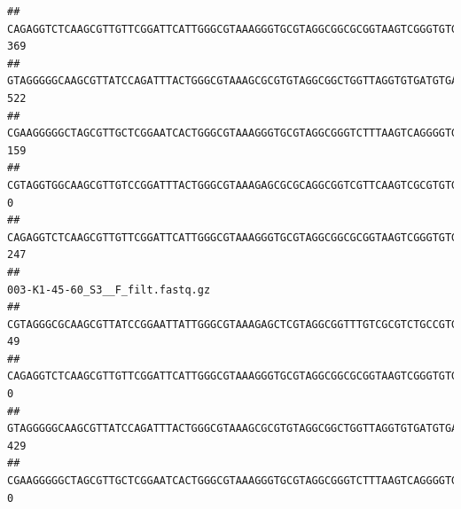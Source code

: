 \documentclass[]{article}
\begin{document}
\begin{verbatim}
## CAGAGGTCTCAAGCGTTGTTCGGATTCATTGGGCGTAAAGGGTGCGTAGGCGGCGCGGTAAGTCGGGTGTGAAATCTCGGAGCTTAACTCCGAAACTGCATTCGATACTGCCGTGCTTGAGGACTGGAGAGGAGACTGGAATTTACGGTGTAGCGGTGAAATGCGTAGATATCGTAAGGAAGACCAGTGGCGAAGGCGGGTCTCTGGACAGTTCCTGACGCTGAGGCACGAAGGCCAGGGGAGCAAACG                              369
## GTAGGGGGCAAGCGTTATCCAGATTTACTGGGCGTAAAGCGCGTGTAGGCGGCTGGTTAGGTGTGATGTGAAATCTTCCGGCTCAACCGGAAAACTGCATTGCAAACCGGCCTGGCTAGAGTGCAGGAGAGGGAAGCGGAATTCCAGGTGTAGCGGTGAAATGCGTAGATATCTGGAGGAACACCAGTGGCGAAGGCGGCTTCCTGGCCTGCAACTGACGCTGAGACGCGAAAGCGTGGGGAGCGAAC                               522
## CGAAGGGGGCTAGCGTTGCTCGGAATCACTGGGCGTAAAGGGTGCGTAGGCGGGTCTTTAAGTCAGGGGTGAAATCCTGGAGCTCAACTCCAGAACTGCCTTTGATACTGAAGATCTTGAGTTCGGGAGAGGTGAGTGGAACTGCGAGTGTAGAGGTGAAATTCGTAGATATTCGCAAGAACACCAGTGGCGAAGGCGGCTCACTGGCCCGATACTGACGCTGAGGCACGAAAGCGTGGGGAGCAAACA                              159
## CGTAGGTGGCAAGCGTTGTCCGGATTTACTGGGCGTAAAGAGCGCGCAGGCGGTCGTTCAAGTCGCGTGTGAAAGCCCCCGGCTCAACTGGGGAGGGTCACGCGATACTGATCGACTCGAAGGCAGGAGAGGGTAGTGGAATTCCCGGTGTAGTGGTGAAATGCGTAGATATCGGGAGGAACACCAGTGGCGAAGGCGACTACCTGGCCTGTTCTTGACGCTGAGGCGCGAAAGCTAGGGGAGCAAACG                                0
## CAGAGGTCTCAAGCGTTGTTCGGATTCATTGGGCGTAAAGGGTGCGTAGGCGGCGCGGTAAGTCGGGTGTGAAATCTCGGGGCTTAACTCCGAAACTGCATTCGATACTGCCGTGCTTGAGGACTGGAGAGGAGACTGGAATTTACGGTGTAGCGGTGAAATGCGTAGATATCGTAAGGAAGACCAGTGGCGAAGGCGGGTCTCTGGACAGTTCCTGACGCTGAGGCACGAAGGCCAGGGGAGCAAACG                              247
##                                                                                                                                                                                                                                                           003-K1-45-60_S3__F_filt.fastq.gz
## CGTAGGGCGCAAGCGTTATCCGGAATTATTGGGCGTAAAGAGCTCGTAGGCGGTTTGTCGCGTCTGCCGTGAAAGTCCGGGGCTCAACTCCGGATCTGCGGTGGGTACGGGCAGACTAGAGTGATGTAGGGGAGACTGGAATTCCTGGTGTAGCGGTGAAATGCGCAGATATCAGGAGGAACACCGATGGCGAAGGCAGGTCTCTGGGCATTAACTGACGCTGAGGAGCGAAAGCATGGGGAGCGAACA                               49
## CAGAGGTCTCAAGCGTTGTTCGGATTCATTGGGCGTAAAGGGTGCGTAGGCGGCGCGGTAAGTCGGGTGTGAAATCTCGGAGCTTAACTCCGAAACTGCATTCGATACTGCCGTGCTTGAGGACTGGAGAGGAGACTGGAATTTACGGTGTAGCGGTGAAATGCGTAGATATCGTAAGGAAGACCAGTGGCGAAGGCGGGTCTCTGGACAGTTCCTGACGCTGAGGCACGAAGGCCAGGGGAGCAAACG                                0
## GTAGGGGGCAAGCGTTATCCAGATTTACTGGGCGTAAAGCGCGTGTAGGCGGCTGGTTAGGTGTGATGTGAAATCTTCCGGCTCAACCGGAAAACTGCATTGCAAACCGGCCTGGCTAGAGTGCAGGAGAGGGAAGCGGAATTCCAGGTGTAGCGGTGAAATGCGTAGATATCTGGAGGAACACCAGTGGCGAAGGCGGCTTCCTGGCCTGCAACTGACGCTGAGACGCGAAAGCGTGGGGAGCGAAC                               429
## CGAAGGGGGCTAGCGTTGCTCGGAATCACTGGGCGTAAAGGGTGCGTAGGCGGGTCTTTAAGTCAGGGGTGAAATCCTGGAGCTCAACTCCAGAACTGCCTTTGATACTGAAGATCTTGAGTTCGGGAGAGGTGAGTGGAACTGCGAGTGTAGAGGTGAAATTCGTAGATATTCGCAAGAACACCAGTGGCGAAGGCGGCTCACTGGCCCGATACTGACGCTGAGGCACGAAAGCGTGGGGAGCAAACA                                0

\end{verbatim}
\end{document}
